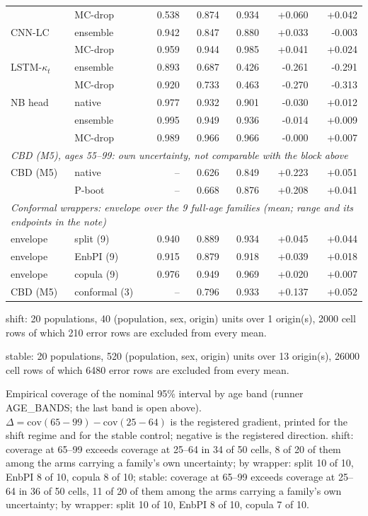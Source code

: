 \begin{table}[tbp]
\begin{threeparttable}
\begin{tabular}{@{}llrrrrr@{}}
 & MC-drop & 0.538 & 0.874 & 0.934 & +0.060 & +0.042 \\
CNN-LC & ensemble & 0.942 & 0.847 & 0.880 & +0.033 & -0.003 \\
 & MC-drop & 0.959 & 0.944 & 0.985 & +0.041 & +0.024 \\
LSTM-$\kappa_t$ & ensemble & 0.893 & 0.687 & 0.426 & -0.261 & -0.291 \\
 & MC-drop & 0.920 & 0.733 & 0.463 & -0.270 & -0.313 \\
NB head & native & 0.977 & 0.932 & 0.901 & -0.030 & +0.012 \\
 & ensemble & 0.995 & 0.949 & 0.936 & -0.014 & +0.009 \\
 & MC-drop & 0.989 & 0.966 & 0.966 & -0.000 & +0.007 \\
\multicolumn{7}{l}{\emph{CBD (M5), ages 55--99: own uncertainty, not comparable with the block above}} \\
\midrule
CBD (M5) & native & -- & 0.626 & 0.849 & +0.223 & +0.051 \\
 & P-boot & -- & 0.668 & 0.876 & +0.208 & +0.041 \\
\multicolumn{7}{l}{\emph{Conformal wrappers: envelope over the 9 full-age families (mean; range and its endpoints in the note)}} \\
\midrule
envelope & split (9) & 0.940 & 0.889 & 0.934 & +0.045 & +0.044 \\
envelope & EnbPI (9) & 0.915 & 0.879 & 0.918 & +0.039 & +0.018 \\
envelope & copula (9) & 0.976 & 0.949 & 0.969 & +0.020 & +0.007 \\
CBD (M5) & conformal (3) & -- & 0.796 & 0.933 & +0.137 & +0.052 \\
\bottomrule
\end{tabular}
\begin{tablenotes}\scriptsize
\item shift: 20 populations, 40 (population, sex, origin) units over 1 origin(s), 2000 cell rows of which 210 error rows are excluded from every mean.
\item stable: 20 populations, 520 (population, sex, origin) units over 13 origin(s), 26000 cell rows of which 6480 error rows are excluded from every mean.
\item Empirical coverage of the nominal 95\% interval by age band (runner AGE\_BANDS; the last band is open above). $\Delta = \mathrm{cov}(65-99) - \mathrm{cov}(25-64)$ is the registered gradient, printed for the shift regime and for the stable control; negative is the registered direction. shift: coverage at 65--99 exceeds coverage at 25--64 in 34 of 50 cells, 8 of 20 of them among the arms carrying a family's own uncertainty; by wrapper: split 10 of 10, EnbPI 8 of 10, copula 8 of 10; stable: coverage at 65--99 exceeds coverage at 25--64 in 36 of 50 cells, 11 of 20 of them among the arms carrying a family's own uncertainty; by wrapper: split 10 of 10, EnbPI 8 of 10, copula 7 of 10.

\end{tablenotes}
\end{threeparttable}
\end{table}
